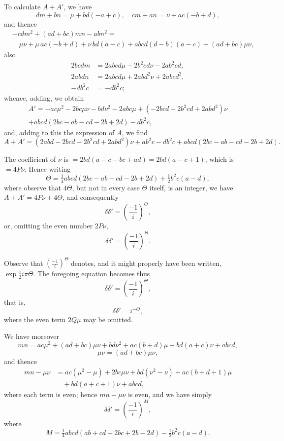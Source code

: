 \documentclass[11pt,a4paper]{book}
\begin{document}
To calculate $A + A'$, we have
\[
dm + bn = \mu + bd(-a + c), \quad cm + an = \nu + ac(-b + d),
\]
and thence
\begin{align*}
&-cdm^2 + (ad + bc)mn - abn^2 =\\
&\quad \mu\nu + \mu\,ac(-b + d) + \nu\,bd(a - c) + abcd(d - b)(a - c) - (ad + bc)\mu\nu,
\end{align*}
also
\begin{align*}
2bcdm &= 2abcd\mu - 2b^2cd\nu - 2ab^2cd,\\
2abdn &= 2abcd\mu + 2abd^2\nu + 2abcd^2,\\
-db^2c &= -db^2c;
\end{align*}
whence, adding, we obtain
\begin{align*}
A' = -ac\mu^2 - 2bc\mu\nu - bd\nu^2 - 2abc\mu + (-2bcd - 2b^2cd + 2abd^2)\nu\\
+ abcd(2bc - ab - cd - 2b + 2d) - db^2c,
\end{align*}
and, adding to this the expression of $A$, we find
\[
A + A' = (2abd - 2bcd - 2b^2cd + 2abd^2)\nu + ab^2c - db^2c + abcd(2bc - ab - cd - 2b + 2d).
\]

The coefficient of $\nu$ is $= 2bd(a - c - bc + ad) = 2bd(a - c + 1)$, which is $= 4P\nu$. Hence writing
\[
\Theta = \tfrac{1}{4}abcd(2bc - ab - cd - 2b + 2d) + \tfrac{1}{2}b^2c(a - d),
\]
where observe that $4\Theta$, but not in every case $\Theta$ itself, is an integer, we have $A + A' = 4P\nu + 4\Theta$, and consequently
\[
\delta\delta' = \left(\frac{-1}{i}\right)^{\Theta},
\]
or, omitting the even number $2P\nu$,
\[
\delta\delta' = \left(\frac{-1}{i}\right)^{\Theta}.
\]

Observe that $\left(\frac{-1}{i}\right)^{\Theta}$ denotes, and it might properly have been written, $\exp\frac{1}{2}i\pi\Theta$. The foregoing equation becomes thus
\[
\delta\delta' = \left(\frac{-1}{i}\right)^{\Theta},
\]
that is,
\[
\delta\delta' = i^{-\Theta},
\]
where the even term $2Q\mu$ may be omitted.

We have moreover
\[
mn = ac\mu^2 + (ad + bc)\mu\nu + bd\nu^2 + ac(b + d)\mu + bd(a + c)\nu + abcd,
\]
\[
\mu\nu = (ad + bc)\mu\nu,
\]
and thence
\begin{align*}
mn - \mu\nu &= ac(\mu^2 - \mu) + 2bc\mu\nu + bd(\nu^2 - \nu) + ac(b + d + 1)\mu\\
&\quad + bd(a + c + 1)\nu + abcd,
\end{align*}
where each term is even; hence $mn - \mu\nu$ is even, and we have simply
\[
\delta\delta' = \left(\frac{-1}{i}\right)^{M},
\]
where
\[
M = \tfrac{1}{4}abcd(ab + cd - 2bc + 2b - 2d) - \tfrac{1}{2}b^2c(a - d).
\]
\end{document}
